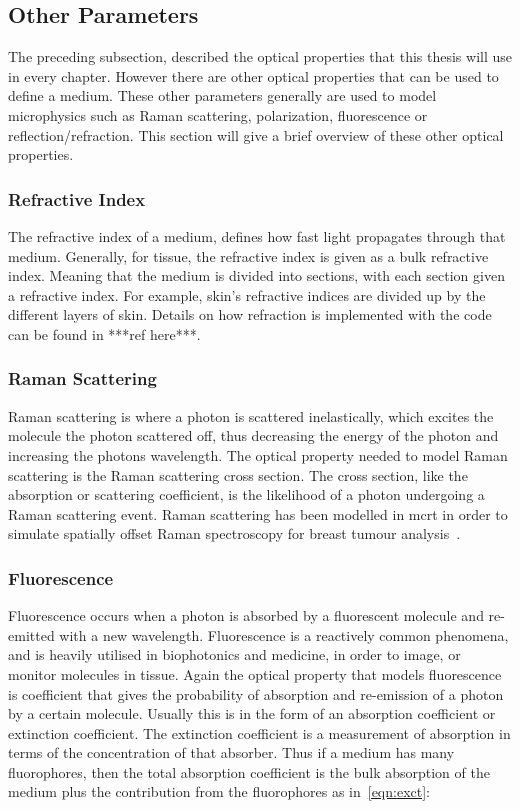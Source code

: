 \subsection*{Other Parameters}\label{sec:other}
The preceding subsection, described the optical properties that this thesis will use in every chapter. However there are other optical properties that can be used to define a medium. These other parameters generally are used to model microphysics such as Raman scattering, polarization, fluorescence or reflection/refraction. This section will give a brief overview of these other optical properties.

\medskip

\subsubsection*{Refractive Index}
The refractive index of a medium, defines how fast light propagates through that medium. Generally, for tissue, the refractive index is given as a bulk refractive index. Meaning that the medium is divided into sections, with each section given a refractive index. For example, skin's refractive indices are divided up by the different layers of skin. Details on how refraction is implemented with the code can  be found in ***ref here***.

\medskip

\subsubsection*{Raman Scattering}
Raman scattering is where a photon is scattered inelastically, which excites the molecule the photon scattered off, thus decreasing the energy of the photon and increasing the photons wavelength. 
The optical property needed to model Raman scattering is the Raman scattering cross section. The cross section, like the absorption or scattering coefficient, is the likelihood of a photon undergoing a Raman scattering event. Raman scattering has been modelled in \gls{mcrt} in order to simulate spatially offset Raman spectroscopy for breast tumour analysis~\cite{keller2010monte}.

\medskip

\subsubsection*{Fluorescence}



Fluorescence occurs when a photon is absorbed by a fluorescent molecule and re-emitted with a new wavelength. Fluorescence	is a reactively common phenomena, and is heavily utilised in biophotonics and medicine, in order to image, or monitor molecules in tissue. Again the optical property that models fluorescence is coefficient that gives the probability of absorption and re-emission of a photon by a certain molecule. Usually this is in the form of an absorption coefficient or extinction coefficient. The extinction coefficient is a measurement of absorption in terms of the concentration of that absorber. Thus if a medium has many fluorophores, then the total absorption coefficient is the bulk absorption of the medium plus the contribution from the fluorophores as in~\cref{eqn:exct}:

